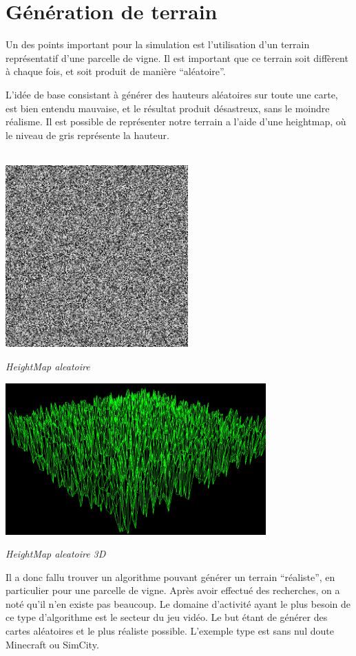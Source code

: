 \documentclass[usenames,dvipsnames]{report}
\begin{document}
    \chapter{Génération de terrain}
    Un des points important pour la simulation est l’utilisation d’un terrain représentatif d’une parcelle de vigne. 
    Il est important que ce terrain soit diffèrent à chaque fois, et soit produit de manière “aléatoire”.

     L’idée de base consistant à générer des hauteurs aléatoires sur toute une carte, est bien entendu mauvaise, et le résultat produit désastreux, sans le moindre réalisme. 
     Il est possible de représenter notre terrain a l’aide d’une heightmap, où le niveau de gris représente la hauteur.


\bigskip
\\
    \includegraphics[width=7cm]{alea.png}


    \textit{HeightMap aleatoire} 

\bigskip
    \includegraphics[width=10cm]{screen_alea-miniature.png}


    \textit{HeightMap aleatoire 3D} 

    Il a donc fallu trouver un algorithme pouvant générer un terrain “réaliste”, en particulier pour une parcelle de vigne.
    Après avoir effectué des recherches, on a  noté qu’il n’en existe pas beaucoup. 
    Le domaine d'activité ayant le plus besoin de ce type d’algorithme est le secteur du jeu vidéo. Le but étant de générer des cartes aléatoires et le plus réaliste possible. L’exemple type est sans nul doute Minecraft ou SimCity.
\\
\end{document}
